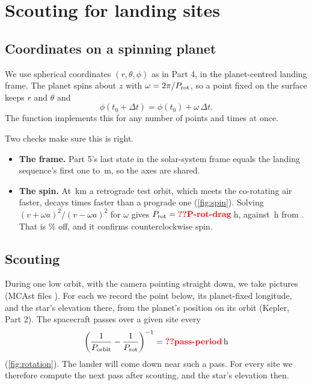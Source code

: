 \documentclass[aps,prd,twocolumn,nofootinbib,floatfix,superscriptaddress]{revtex4-2}
\begin{document}
\section{Scouting for landing sites}\label{sec:sites}
\subsection{Coordinates on a spinning planet}
We use spherical coordinates $(r,\theta,\phi)$ as in Part 4, in the planet-centred landing frame.
The planet spins about $z$ with $\omega=2\pi/P_{\rm rot}$, so a point fixed on the surface keeps $r$ and $\theta$ and
\begin{equation}
  \phi(t_0+\Delta t)=\phi(t_0)+\omega\,\Delta t .
\end{equation}
The function  implements this for any number of points and times at once.

Two checks make sure this is right.
\begin{itemize}
\item \textbf{The frame.} Part 5's last state in the solar-system frame equals the landing sequence's first one to \,m, so the axes are shared.
\item \textbf{The spin.} At \,km a retrograde test orbit, which meets the co-rotating air faster, decays  times faster than a prograde one (\cref{fig:spin}). Solving $(v+\omega a)^2/(v-\omega a)^2$ for $\omega$ gives $P_{\rm rot}=\val{P-rot-drag}$\,h, against \,h from . That is \% off, and it confirms counterclockwise spin.
\end{itemize}

\subsection{Scouting}
During one low orbit, with the camera pointing straight down, we take  pictures (MCAst files ).
For each we record the point below, its planet-fixed longitude, and the star's elevation there, from the planet's position on its orbit (Kepler, Part 2).
The spacecraft passes over a given site every
\begin{equation}
  \left(\frac{1}{P_{\rm orbit}}-\frac{1}{P_{\rm rot}}\right)^{-1}=\val{pass-period}\,\mathrm{h}
\end{equation}
(\cref{fig:rotation}).
The lander will come down near such a pass.
For every site we therefore compute the next pass after scouting, and the star's elevation then.
\end{document}
